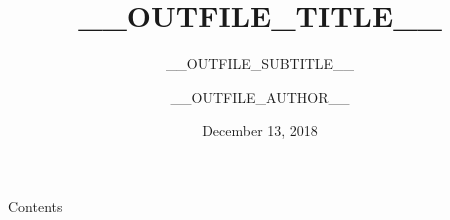 \documentclass[aspectratio=169]{beamer}
\title{__OUTFILE_TITLE__}
\subtitle{__OUTFILE_SUBTITLE__}
\author{__OUTFILE_AUTHOR__}
\institute{__OUTFILE_INSTITUTE__}
\date{December 13, 2018}
\begin{document}

\begin{frame}
	\titlepage
\end{frame}

\begin{frame}{Contents}
	\tableofcontents
\end{frame}

\makeatother


\end{document}
